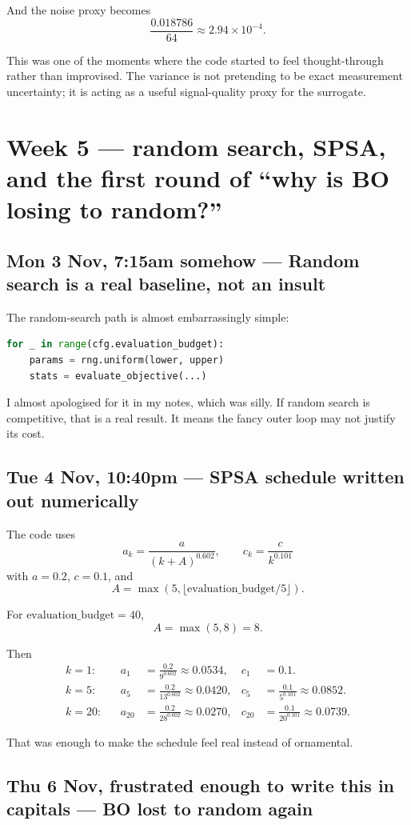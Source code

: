 \documentclass[11pt]{article}
\newcommand{\entry}[2]{\subsection*{#1 --- #2}}
\begin{document}
And the noise proxy becomes
\[
\frac{0.018786}{64} \approx 2.94\times 10^{-4}.
\]

This was one of the moments where the code started to feel thought-through rather than improvised.
The variance is not pretending to be exact measurement uncertainty; it is acting as a useful
signal-quality proxy for the surrogate.

\section*{Week 5 --- random search, SPSA, and the first round of ``why is BO losing to random?''}

\entry{Mon 3 Nov, 7:15am somehow}{Random search is a real baseline, not an insult}

The random-search path is almost embarrassingly simple:

\begin{lstlisting}[language=Python]
for _ in range(cfg.evaluation_budget):
    params = rng.uniform(lower, upper)
    stats = evaluate_objective(...)
\end{lstlisting}

I almost apologised for it in my notes, which was silly. If random search is competitive,
that is a real result. It means the fancy outer loop may not justify its cost.

\entry{Tue 4 Nov, 10:40pm}{SPSA schedule written out numerically}

The code uses
\[
a_k = \frac{a}{(k+A)^{0.602}},
\qquad
c_k = \frac{c}{k^{0.101}}
\]
with \(a=0.2\), \(c=0.1\), and
\[
A = \max(5, \lfloor \text{evaluation\_budget}/5 \rfloor).
\]

For \(\text{evaluation\_budget}=40\),
\[
A = \max(5, 8) = 8.
\]

Then
\begin{align*}
k=1:
&&
a_1 &= \frac{0.2}{9^{0.602}} \approx 0.0534,
&
c_1 &= 0.1.
\\
k=5:
&&
a_5 &= \frac{0.2}{13^{0.602}} \approx 0.0420,
&
c_5 &= \frac{0.1}{5^{0.101}} \approx 0.0852.
\\
k=20:
&&
a_{20} &= \frac{0.2}{28^{0.602}} \approx 0.0270,
&
c_{20} &= \frac{0.1}{20^{0.101}} \approx 0.0739.
\end{align*}

That was enough to make the schedule feel real instead of ornamental.

\entry{Thu 6 Nov, frustrated enough to write this in capitals}{BO lost to random again}
\end{document}
